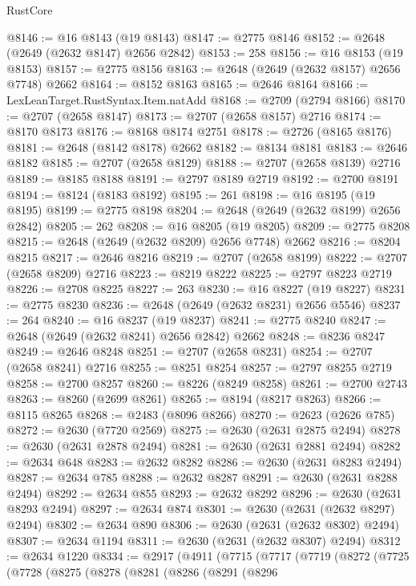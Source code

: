 \begin{lexlean}{RustCore}
\begin{coremodule}
@8146 := @16 @8143 (@19 @8143)
@8147 := @2775 @8146
@8152 := @2648 (@2649 (@2632 @8147) @2656 @2842)
@8153 := 258
@8156 := @16 @8153 (@19 @8153)
@8157 := @2775 @8156
@8163 := @2648 (@2649 (@2632 @8157) @2656 @7748) @2662
@8164 := @8152 @8163
@8165 := @2646 @8164
@8166 := LexLeanTarget.RustSyntax.Item.natAdd
@8168 := @2709 (@2794 @8166)
@8170 := @2707 (@2658 @8147)
@8173 := @2707 (@2658 @8157) @2716
@8174 := @8170 @8173
@8176 := @8168 @8174 @2751
@8178 := @2726 (@8165 @8176)
@8181 := @2648 (@8142 @8178) @2662
@8182 := @8134 @8181
@8183 := @2646 @8182
@8185 := @2707 (@2658 @8129)
@8188 := @2707 (@2658 @8139) @2716
@8189 := @8185 @8188
@8191 := @2797 @8189 @2719
@8192 := @2700 @8191
@8194 := @8124 (@8183 @8192)
@8195 := 261
@8198 := @16 @8195 (@19 @8195)
@8199 := @2775 @8198
@8204 := @2648 (@2649 (@2632 @8199) @2656 @2842)
@8205 := 262
@8208 := @16 @8205 (@19 @8205)
@8209 := @2775 @8208
@8215 := @2648 (@2649 (@2632 @8209) @2656 @7748) @2662
@8216 := @8204 @8215
@8217 := @2646 @8216
@8219 := @2707 (@2658 @8199)
@8222 := @2707 (@2658 @8209) @2716
@8223 := @8219 @8222
@8225 := @2797 @8223 @2719
@8226 := @2708 @8225
@8227 := 263
@8230 := @16 @8227 (@19 @8227)
@8231 := @2775 @8230
@8236 := @2648 (@2649 (@2632 @8231) @2656 @5546)
@8237 := 264
@8240 := @16 @8237 (@19 @8237)
@8241 := @2775 @8240
@8247 := @2648 (@2649 (@2632 @8241) @2656 @2842) @2662
@8248 := @8236 @8247
@8249 := @2646 @8248
@8251 := @2707 (@2658 @8231)
@8254 := @2707 (@2658 @8241) @2716
@8255 := @8251 @8254
@8257 := @2797 @8255 @2719
@8258 := @2700 @8257
@8260 := @8226 (@8249 @8258)
@8261 := @2700 @2743
@8263 := @8260 (@2699 @8261)
@8265 := @8194 (@8217 @8263)
@8266 := @8115 @8265
@8268 := @2483 (@8096 @8266)
@8270 := @2623 (@2626 @785)
@8272 := @2630 (@7720 @2569)
@8275 := @2630 (@2631 @2875 @2494)
@8278 := @2630 (@2631 @2878 @2494)
@8281 := @2630 (@2631 @2881 @2494)
@8282 := @2634 @648
@8283 := @2632 @8282
@8286 := @2630 (@2631 @8283 @2494)
@8287 := @2634 @785
@8288 := @2632 @8287
@8291 := @2630 (@2631 @8288 @2494)
@8292 := @2634 @855
@8293 := @2632 @8292
@8296 := @2630 (@2631 @8293 @2494)
@8297 := @2634 @874
@8301 := @2630 (@2631 (@2632 @8297) @2494)
@8302 := @2634 @890
@8306 := @2630 (@2631 (@2632 @8302) @2494)
@8307 := @2634 @1194
@8311 := @2630 (@2631 (@2632 @8307) @2494)
@8312 := @2634 @1220
@8334 := @2917
    (@4911
      (@7715
        (@7717
          (@7719
            (@8272
              (@7725
                (@7728
                  (@8275
                    (@8278
                      (@8281
                        (@8286
                          (@8291
                            (@8296

\end{coremodule}
\end{lexlean}
